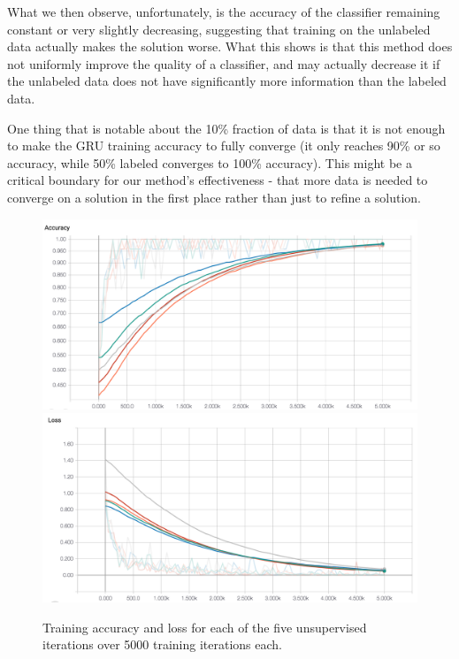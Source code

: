 \documentclass[11pt,letterpaper]{article}
\begin{document}
  What we then observe, unfortunately, is the accuracy of the classifier remaining constant or very slightly decreasing, suggesting that training on the unlabeled data actually makes the solution worse. What this shows is that this method does not uniformly improve the quality of a classifier, and may actually decrease it if the unlabeled data does not have significantly more information than the labeled data.
  
  One thing that is notable about the 10\% fraction of data is that it is not enough to make the GRU training accuracy to fully converge (it only reaches 90\% or so accuracy, while 50\% labeled converges to 100\% accuracy). This might be a critical boundary for our method's effectiveness - that more data is needed to converge on a solution in the first place rather than just to refine a solution. 
 
  \begin{figure}
	\includegraphics[scale = .24]{acc-unsupervised}
	\includegraphics[scale = .24]{unsupervised-success}
	\caption{Training accuracy and loss for each of the five unsupervised iterations over 5000 training iterations each.}
\end{figure}
\end{document}
